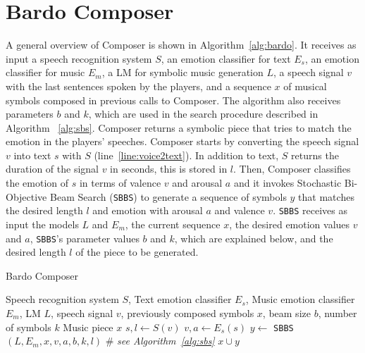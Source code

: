 \section{Bardo Composer}

A general overview of Composer is shown in Algorithm~\ref{alg:bardo}. It receives as input a speech recognition system $S$, an emotion classifier for text $E_s$, an emotion classifier for music $E_m$, a LM for symbolic music generation $L$, a speech signal $v$ with the last sentences spoken by the players, and a sequence $x$ of musical symbols composed in previous calls to Composer. The algorithm also receives parameters $b$ and $k$, which are used in the search procedure described in Algorithm ~\ref{alg:sbs}. Composer returns a symbolic piece that tries to match the emotion in the players' speeches. Composer starts by converting the speech signal $v$ into text $s$ with $S$ (line~\ref{line:voice2text}). In addition to text, $S$ returns the duration of the signal $v$ in seconds, this is stored in $l$. Then, Composer classifies the emotion of $s$ in terms of valence $v$ and arousal $a$ and it invokes Stochastic Bi-Objective Beam Search (\texttt{SBBS}) to generate a sequence of symbols $y$ that matches the desired length $l$ and emotion with arousal $a$ and valence $v$. \texttt{SBBS} receives as input the models $L$ and $E_m$, the current sequence $x$, the desired emotion values $v$ and $a$, \texttt{SBBS}'s parameter values $b$ and $k$, which are explained below, and the desired length $l$ of the piece to be generated. %

\begin{algorithm}[h]
\caption{Bardo Composer}
\label{alg:bardo}
\begin{algorithmic}[1]
\REQUIRE Speech recognition system $S$, Text emotion classifier $E_s$, Music emotion classifier $E_m$, LM $L$, speech signal $v$, previously composed symbols $x$, beam size $b$, number of symbols $k$
\ENSURE Music piece $x$
\STATE $s, l \gets S(v)$ \label{line:voice2text}
\STATE $v, a \gets E_s(s)$ \label{line:emotion_classification}
\STATE $y \gets$ \texttt{SBBS}$(L, E_m, x, v, a, b, k, l)$ \# \emph{see Algorithm~\ref{alg:sbs}} \label{line:sbs}
\RETURN $x \cup y$ \label{line:generation2}
\end{algorithmic}
\end{algorithm}

